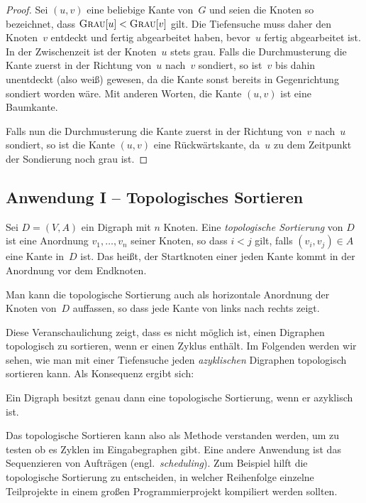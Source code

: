 \begin{proof}
Sei $(u,v)$ eine beliebige Kante von~$G$ und seien die Knoten so bezeichnet, dass $\mathop{\text{\textsc{Grau}}}[u] < \mathop{\text{\textsc{Grau}}}[v]$ gilt.
Die Tiefensuche muss daher den Knoten~$v$ entdeckt und fertig abgearbeitet haben, bevor~$u$ fertig abgearbeitet ist.
In der Zwischenzeit ist der Knoten~$u$ stets grau.
Falls die Durchmusterung die Kante zuerst in der Richtung von~$u$ nach~$v$ sondiert, so ist~$v$ bis dahin unentdeckt (also weiß) gewesen, da die Kante sonst bereits in Gegenrichtung sondiert worden wäre.
Mit anderen Worten, die Kante $(u,v)$ ist eine Baumkante.

Falls nun die Durchmusterung die Kante zuerst in der Richtung von~$v$ nach~$u$ sondiert, so ist die Kante $(u,v)$ eine Rückwärtskante, da~$u$ zu dem Zeitpunkt der Sondierung noch grau ist.
\end{proof}




\subsection{Anwendung I -- Topologisches Sortieren}

\begin{defn} 
Sei $D=(V,A)$ ein Digraph mit $n$ Knoten.
Eine \emph{topologische Sortierung} von $D$ ist eine Anordnung $v_1,\ldots,v_n$ seiner Knoten, so dass $i < j$ gilt, falls $(v_i,v_j) \in A$ eine Kante in~$D$ ist.
Das heißt, der Startknoten einer jeden Kante kommt in der Anordnung vor dem Endknoten.
\end{defn} 

\begin{bem}
Man kann die topologische Sortierung auch als horizontale Anordnung der Knoten von~$D$ auffassen, so dass jede Kante von links nach rechts zeigt.

Diese Veranschaulichung zeigt, dass es nicht möglich ist, einen Digraphen topologisch zu sortieren, wenn er einen Zyklus enthält.
Im Folgenden werden wir sehen, wie man mit einer Tiefensuche jeden \emph{azyklischen} Digraphen topologisch sortieren kann.
Als Konsequenz ergibt sich:
\end{bem} 

\begin{prop}
Ein Digraph besitzt genau dann eine topologische Sortierung, wenn er azyklisch ist.
\end{prop}

\begin{bem} 
Das topologische Sortieren kann also als Methode verstanden werden, um zu testen ob es Zyklen im Eingabegraphen gibt.
Eine andere Anwendung ist das Sequenzieren von Aufträgen (engl.~\emph{scheduling}).
Zum Beispiel hilft die topologische Sortierung zu entscheiden, in welcher Reihenfolge einzelne Teilprojekte in einem großen Programmierprojekt kompiliert werden sollten.
\end{bem} 

